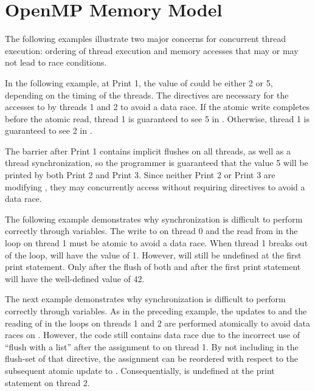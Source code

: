 
\pagebreak
\section{OpenMP Memory Model}
\label{sec:mem_model}

The following examples illustrate two major concerns for concurrent thread
execution: ordering of thread execution and memory accesses that may or may not
lead to race conditions.

In the following example, at Print 1, the value of  could be either 2
or 5, depending on the timing of the threads. The  directives are
necessary for the accesses to  by threads 1 and 2 to avoid a data race.
If the atomic write completes before the atomic read, thread 1 is guaranteed to
see 5 in . Otherwise, thread 1 is guaranteed to see 2 in .

The barrier after Print 1 contains implicit flushes on all threads, as well as
a thread synchronization, so the programmer is guaranteed that the value 5 will
be printed by both Print 2 and Print 3. Since neither Print 2 or Print 3 are modifying
, they may concurrently access  without requiring 
directives to avoid a data race.



\pagebreak
The following example demonstrates why synchronization is difficult to perform
correctly through variables. The write to  on thread 0 and the read
from  in the loop on thread 1 must be atomic to avoid a data race.
When thread 1 breaks out of the loop,  will have the value of 1.
However,  will still be undefined at the first print statement. Only
after the flush of both  and  after the first print
statement will  have the well-defined value of 42.



\pagebreak
The next example demonstrates why synchronization is difficult to perform
correctly through variables. As in the preceding example, the updates to
 and the reading of  in the loops on threads 1 and 2 are
performed atomically to avoid data races on . However, the code still
contains data race due to the incorrect use of ``flush with a list'' after the
assignment to  on thread 1. By not including  in the
flush-set of that  directive, the assignment can be reordered with
respect to the subsequent atomic update to . Consequentially,
 is undefined at the print statement on thread 2.




